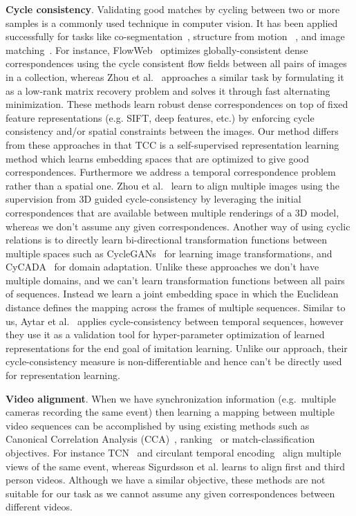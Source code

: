 \documentclass[10pt,twocolumn,letterpaper]{article}
\begin{document}
\noindent\textbf{Cycle consistency}. Validating good matches by cycling between two or more samples is a commonly used technique in computer vision. It has been applied successfully for tasks like co-segmentation~\cite{wang2014unsupervised,wang2013image}, structure from motion ~\cite{zach2010disambiguating,wilson2013network}, and image matching~\cite{zhou2015multi,zhou2016learning,zhou2015flowweb}.  
For instance, FlowWeb~\cite{zhou2015flowweb} optimizes globally-consistent
dense correspondences using the cycle consistent flow fields between all pairs of images in a collection, whereas Zhou et al.~\cite{zhou2015multi} approaches a similar task by formulating it as a low-rank matrix recovery problem and solves it through fast alternating minimization. These methods learn robust dense correspondences on top of fixed feature representations (e.g. SIFT, deep features, etc.) by enforcing cycle consistency and/or spatial constraints between the images. Our method differs from these approaches in that TCC is a self-supervised representation learning method which learns embedding spaces that are optimized to give good correspondences. Furthermore we address a temporal correspondence problem rather than a spatial one.
Zhou et al.~\cite{zhou2016learning} learn to align multiple images using the supervision from 3D guided cycle-consistency by leveraging the initial correspondences that are available between multiple renderings of a 3D model, whereas we don't assume any given correspondences. Another way of using cyclic relations is to directly learn bi-directional transformation functions between multiple spaces such as CycleGANs~\cite{zhu2017unpaired} for learning image transformations, and CyCADA~\cite{hoffman2017cycada} for domain adaptation. Unlike these approaches we don't have multiple domains, and we can't learn transformation functions between all pairs of sequences. Instead we learn a joint embedding space in which the Euclidean distance defines the mapping across the frames of multiple sequences.  Similar to us, Aytar et al.~\cite{aytar2018playing} applies cycle-consistency between temporal sequences, however they use it as a validation tool for hyper-parameter optimization of learned representations for the end goal of imitation learning. Unlike our approach, their cycle-consistency measure is non-differentiable and hence can't be directly used for representation learning. 

\noindent\textbf{Video alignment}. When we have synchronization information (e.g.\ multiple cameras recording the same event) then learning a mapping between multiple video sequences can be accomplished by using existing methods such as Canonical Correlation Analysis (CCA)~\cite{anderson1958introduction,andrew2013deep}, ranking~\cite{Sermanet2017TCN} or match-classification~\cite{arandjelovic2017look} objectives. For instance TCN~\cite{Sermanet2017TCN} and circulant temporal encoding~\cite{revaud2013event} align multiple views of the same event, whereas Sigurdsson et al.\cite{sigurdsson2018actor} learns to align first and third person videos. Although we have a similar objective, these methods are not suitable for our task as we cannot assume any given correspondences between different videos.
\end{document}
